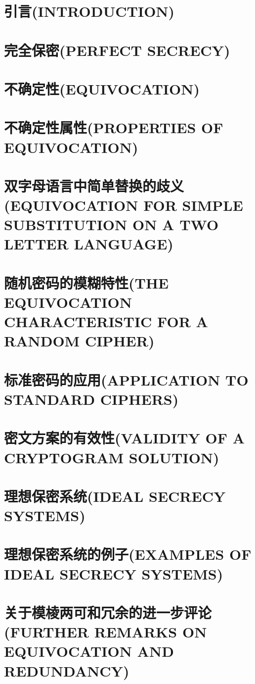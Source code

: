 \documentclass[]{article}
\begin{document}
\section{引言(INTRODUCTION)}

\section{完全保密(PERFECT SECRECY)}

\section{不确定性(EQUIVOCATION)}

\section{不确定性属性(PROPERTIES OF EQUIVOCATION)}

\section{双字母语言中简单替换的歧义(EQUIVOCATION FOR SIMPLE SUBSTITUTION ON A TWO LETTER LANGUAGE)}

\section{随机密码的模糊特性(THE EQUIVOCATION CHARACTERISTIC FOR A RANDOM CIPHER)}

\section{标准密码的应用(APPLICATION TO STANDARD CIPHERS)}

\section{密文方案的有效性(VALIDITY OF A CRYPTOGRAM SOLUTION)}

\section{理想保密系统(IDEAL SECRECY SYSTEMS)}

\section{理想保密系统的例子(EXAMPLES OF IDEAL SECRECY SYSTEMS)}

\section{关于模棱两可和冗余的进一步评论(FURTHER REMARKS ON EQUIVOCATION AND REDUNDANCY)}
\end{document}
